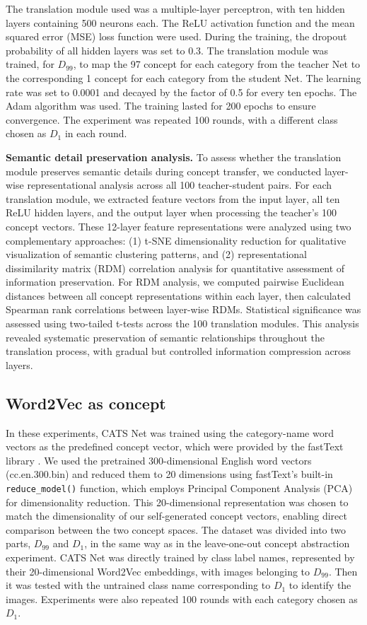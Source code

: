 \documentclass[pdflatex,sn-mathphys-num,lineno]{sn-jnl}%
\begin{document}
\begin{CJK}{UTF8}{gbsn}
The translation module used was a multiple-layer perceptron, with ten hidden layers containing 500 neurons each. The ReLU activation function and the mean squared error (MSE) loss function were used. During the training, the dropout probability of all hidden layers was set to 0.3. The translation module was trained, for $D_{99}$, to map the 97 concept for each category from the teacher Net to the corresponding 1 concept for each category from the student Net. The learning rate was set to 0.0001 and decayed by the factor of 0.5 for every ten epochs. The Adam \cite{kingma_adam_2015} algorithm was used. The training lasted for 200 epochs to ensure convergence. The experiment was repeated 100 rounds, with a different class chosen as $D_1$ in each round.

\textbf{Semantic detail preservation analysis.} To assess whether the translation module preserves semantic details during concept transfer, we conducted layer-wise representational analysis across all 100 teacher-student pairs. For each translation module, we extracted feature vectors from the input layer, all ten ReLU hidden layers, and the output layer when processing the teacher's 100 concept vectors. These 12-layer feature representations were analyzed using two complementary approaches: (1) t-SNE dimensionality reduction for qualitative visualization of semantic clustering patterns, and (2) representational dissimilarity matrix (RDM) correlation analysis for quantitative assessment of information preservation. For RDM analysis, we computed pairwise Euclidean distances between all concept representations within each layer, then calculated Spearman rank correlations between layer-wise RDMs. Statistical significance was assessed using two-tailed t-tests across the 100 translation modules. This analysis revealed systematic preservation of semantic relationships throughout the translation process, with gradual but controlled information compression across layers.

\subsection{Word2Vec as concept}
In these experiments, CATS Net was trained using the category-name word vectors as the predefined concept vector, which were provided by the fastText library \cite{mikolov_advances_2018}. We used the pretrained 300-dimensional English word vectors (cc.en.300.bin) and reduced them to 20 dimensions using fastText's built-in \texttt{reduce\_model()} function, which employs Principal Component Analysis (PCA) for dimensionality reduction. This 20-dimensional representation was chosen to match the dimensionality of our self-generated concept vectors, enabling direct comparison between the two concept spaces. The dataset was divided into two parts, $D_{99}$ and $D_1$, in the same way as in the leave-one-out concept abstraction experiment. CATS Net was directly trained by class label names, represented by their 20-dimensional Word2Vec embeddings, with images belonging to $D_{99}$. Then it was tested with the untrained class name corresponding to $D_1$ to identify the images. Experiments were also repeated 100 rounds with each category chosen as $D_1$.


\end{CJK}
\end{document}
